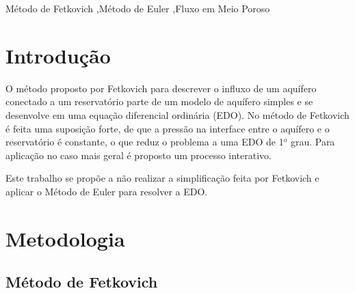 \documentclass[final,5p]{elsarticle}
\numberwithin{equation}{section}
\begin{document}
\begin{frontmatter}
\begin{abstract}
\end{abstract}




\begin{keyword}
    Método de Fetkovich \sep Método de Euler \sep Fluxo em Meio Poroso



\end{keyword}

\end{frontmatter}


\section{Introdução}

    O método proposto por Fetkovich para descrever o influxo de um aquífero conectado a um reservatório parte de um modelo de aquífero simples e se desenvolve em uma equação diferencial ordinária (EDO). No método de Fetkovich é feita uma suposição forte, de que a pressão na interface entre o aquífero e o reservatório é constante, o que reduz o problema a uma EDO de 1$^o$ grau. Para aplicação no caso mais geral é proposto um processo interativo.

    Este trabalho se propõe a não realizar a simplificação feita por Fetkovich e aplicar o Método de Euler para resolver a EDO.

\section{Metodologia}

    \subsection{Método de Fetkovich}
\end{document}
